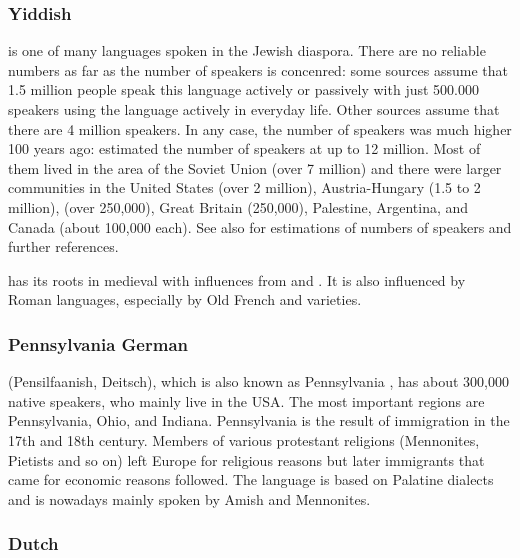 \subsubsection{Yiddish}

 is one of many languages spoken in the Jewish diaspora. There are no reliable numbers
as far as the number of speakers is concenred: some sources assume that
1.5 million people speak this language actively or passively with just 500.000 speakers using the language
actively in everyday life. Other sources assume that there are 4 million
speakers. In any case, the number of  speakers was much
higher 100 years ago: \citet[]{Birnbaum1915a-u} estimated the number of speakers at up to 12 million. Most of
them lived in the area of the Soviet Union (over 7 million) and there were larger communities in the United States (over 2 million), Austria-Hungary
(1.5 to 2 million),  (over 250,000), Great Britain
(250,000), Palestine, Argentina, and Canada (about 100,000 each). See also  for
estimations of numbers of speakers and further references.

 has its roots
in medieval  with influences from  and . It is also influenced by
Roman languages, especially by Old French and  varieties.


\subsubsection{Pennsylvania German}

 (Pensilfaanish, Deitsch), which is also known as Pennsylvania , has about 300,000
native speakers, who mainly live in the USA. The most important regions are Pennsylvania, Ohio, and
Indiana. Pennsylvania  is the result of immigration in the 17th and 18th century. Members of
various protestant religions (Mennonites, Pietists and so on) left Europe for religious reasons  
but later immigrants that came for economic reasons followed.  The language is
based on Palatine dialects and is nowadays mainly spoken by Amish and Mennonites.




\subsubsection{Dutch}

